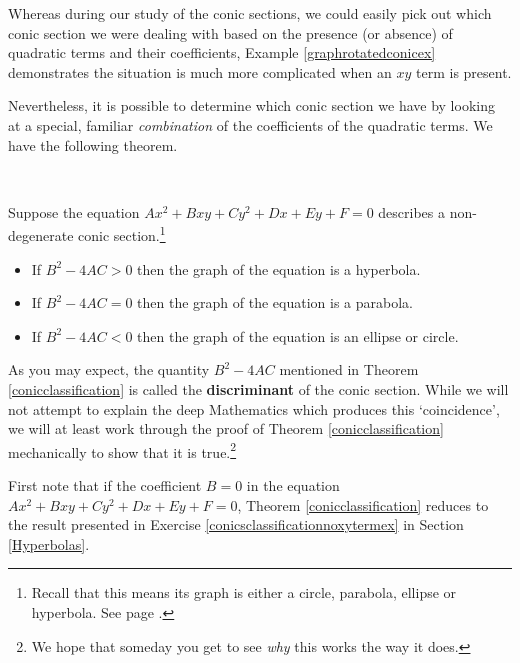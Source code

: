\documentclass{ximera}
\begin{document}
 

Whereas during our study of the conic sections, we could easily pick out which conic section we were dealing with based on the presence (or absence) of quadratic terms and their coefficients, Example  \ref{graphrotatedconicex} demonstrates the situation is much more complicated when an  $xy$ term is present. 

 

 Nevertheless,  it is possible to determine which conic section we have by looking at a special, familiar  \textit{combination} of the coefficients of the quadratic terms.  We have the following theorem.

 
\begin{theorem} \label{conicclassification} $~$

Suppose the equation $Ax^2 + Bxy + Cy^2 + Dx + Ey + F = 0$ describes a non-degenerate conic section.\footnote{Recall that this means its graph is either a circle, parabola, ellipse or hyperbola.  See page \pageref{degenerateconics}.}

\begin{itemize}

\item If $B^2 - 4AC > 0$ then the graph of the equation is a hyperbola.

\item If $B^2 - 4AC =0$ then the graph of the equation is a parabola.

\item If $B^2 - 4AC < 0$ then the graph of the equation is an ellipse or circle.

\end{itemize}

\end{theorem}
  

As you may expect, the quantity $B^2 - 4AC$ mentioned in Theorem \ref{conicclassification} is called the \textbf{discriminant} of the conic section.  While we will not attempt to explain the deep Mathematics which produces this `coincidence', we will at least work through the proof of Theorem \ref{conicclassification} mechanically to show that it is true.\footnote{We hope that someday you get to see \emph{why} this works the way it does.}  

 

First note that if the coefficient $B=0$ in the equation $Ax^2 + Bxy + Cy^2 + Dx + Ey + F = 0$, Theorem \ref{conicclassification} reduces to the result presented in Exercise \ref{conicsclassificationnoxytermex} in Section \ref{Hyperbolas}.
\end{document}
